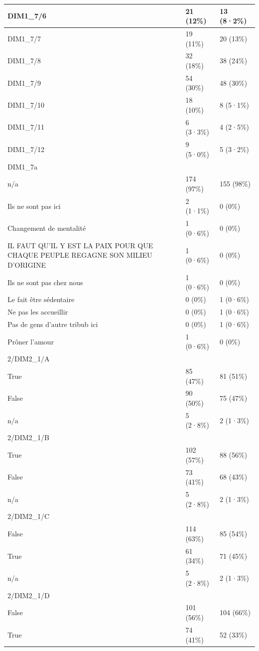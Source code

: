 \documentclass[
]{book}
\begin{document}
\begin{tabular}{l|l|l}
\hline
DIM1\_7/6 & 21 (12\%) & 13 (8·2\%)\\
\hline
DIM1\_7/7 & 19 (11\%) & 20 (13\%)\\
\hline
DIM1\_7/8 & 32 (18\%) & 38 (24\%)\\
\hline
DIM1\_7/9 & 54 (30\%) & 48 (30\%)\\
\hline
DIM1\_7/10 & 18 (10\%) & 8 (5·1\%)\\
\hline
DIM1\_7/11 & 6 (3·3\%) & 4 (2·5\%)\\
\hline
DIM1\_7/12 & 9 (5·0\%) & 5 (3·2\%)\\
\hline
DIM1\_7a &  & \\
\hline
n/a & 174 (97\%) & 155 (98\%)\\
\hline
Ils ne sont pas ici & 2 (1·1\%) & 0 (0\%)\\
\hline
Changement de mentalité & 1 (0·6\%) & 0 (0\%)\\
\hline
IL FAUT QU'IL Y EST LA PAIX POUR QUE CHAQUE PEUPLE REGAGNE SON MILIEU D'ORIGINE & 1 (0·6\%) & 0 (0\%)\\
\hline
Ils ne sont pas chez nous & 1 (0·6\%) & 0 (0\%)\\
\hline
Le fait être sédentaire & 0 (0\%) & 1 (0·6\%)\\
\hline
Ne pas les accueillir & 0 (0\%) & 1 (0·6\%)\\
\hline
Pas de gens d'autre tribub ici & 0 (0\%) & 1 (0·6\%)\\
\hline
Prôner l'amour & 1 (0·6\%) & 0 (0\%)\\
\hline
2/DIM2\_1/A &  & \\
\hline
True & 85 (47\%) & 81 (51\%)\\
\hline
False & 90 (50\%) & 75 (47\%)\\
\hline
n/a & 5 (2·8\%) & 2 (1·3\%)\\
\hline
2/DIM2\_1/B &  & \\
\hline
True & 102 (57\%) & 88 (56\%)\\
\hline
False & 73 (41\%) & 68 (43\%)\\
\hline
n/a & 5 (2·8\%) & 2 (1·3\%)\\
\hline
2/DIM2\_1/C &  & \\
\hline
False & 114 (63\%) & 85 (54\%)\\
\hline
True & 61 (34\%) & 71 (45\%)\\
\hline
n/a & 5 (2·8\%) & 2 (1·3\%)\\
\hline
2/DIM2\_1/D &  & \\
\hline
False & 101 (56\%) & 104 (66\%)\\
\hline
True & 74 (41\%) & 52 (33\%)\\

\end{tabular}
\end{document}
